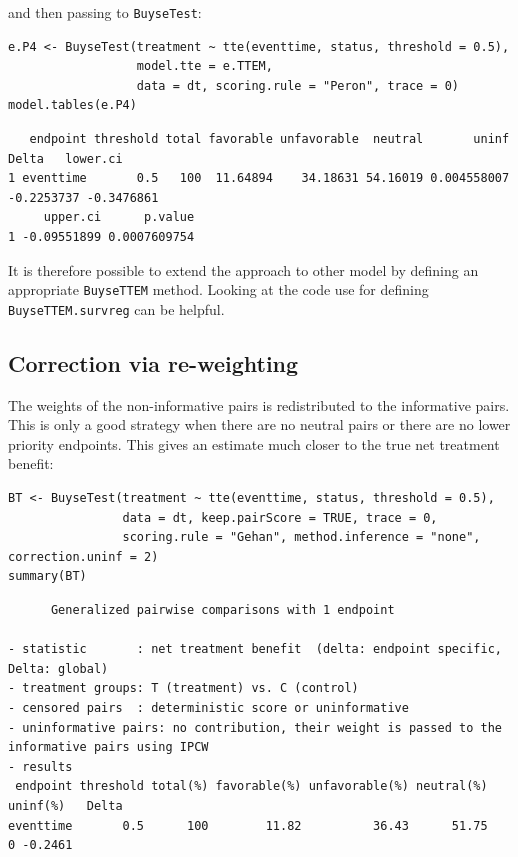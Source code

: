 \documentclass[12pt]{article}
\begin{document}
and then passing to \texttt{BuyseTest}:
\lstset{language=r,label= ,caption= ,captionpos=b,numbers=none}
\begin{lstlisting}
e.P4 <- BuyseTest(treatment ~ tte(eventtime, status, threshold = 0.5),
                  model.tte = e.TTEM,
                  data = dt, scoring.rule = "Peron", trace = 0)
model.tables(e.P4)
\end{lstlisting}

\begin{verbatim}
   endpoint threshold total favorable unfavorable  neutral       uninf      Delta   lower.ci
1 eventtime       0.5   100  11.64894    34.18631 54.16019 0.004558007 -0.2253737 -0.3476861
     upper.ci      p.value
1 -0.09551899 0.0007609754
\end{verbatim}


It is therefore possible to extend the approach to other model by
defining an appropriate \texttt{BuyseTTEM} method. Looking at the code use
for defining \texttt{BuyseTTEM.survreg} can be helpful.

\subsection{Correction via re-weighting}
\label{sec:orgb20bee3}

The weights of the non-informative pairs is redistributed
to the informative pairs. This is only a good strategy when there are
no neutral pairs or there are no lower priority endpoints. This gives
an estimate much closer to the true net treatment benefit:
\lstset{language=r,label= ,caption= ,captionpos=b,numbers=none}
\begin{lstlisting}
BT <- BuyseTest(treatment ~ tte(eventtime, status, threshold = 0.5),
                data = dt, keep.pairScore = TRUE, trace = 0,
                scoring.rule = "Gehan", method.inference = "none", correction.uninf = 2)
summary(BT)
\end{lstlisting}

\begin{verbatim}
      Generalized pairwise comparisons with 1 endpoint

- statistic       : net treatment benefit  (delta: endpoint specific, Delta: global) 
- treatment groups: T (treatment) vs. C (control) 
- censored pairs  : deterministic score or uninformative
- uninformative pairs: no contribution, their weight is passed to the informative pairs using IPCW
- results
 endpoint threshold total(%) favorable(%) unfavorable(%) neutral(%) uninf(%)   Delta
eventtime       0.5      100        11.82          36.43      51.75        0 -0.2461
\end{verbatim}
\end{document}
